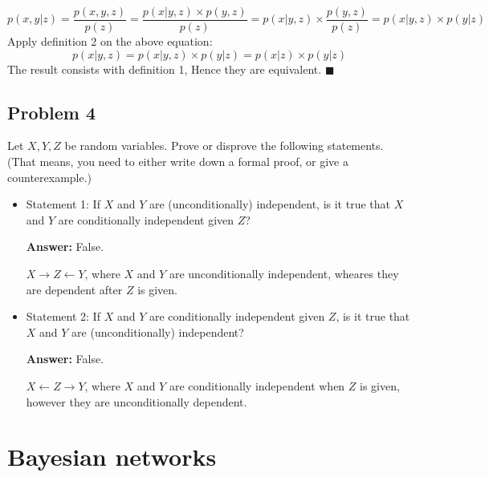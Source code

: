 \documentclass[]{article}
\begin{document}
$$p(x, y|z) = \frac{p(x, y, z)}{p(z)} = \frac{p(x|y, z)\times p(y, z)}{p(z)} = p(x|y, z)\times\frac{p(y, z)}{p(z)} = p(x|y, z)\times p(y|z)$$
Apply definition 2 on the above equation:
$$p(x|y, z) = p(x|y, z)\times p(y|z) = p(x|z)\times p(y|z)$$
The result consists with definition 1, Hence they are equivalent. \hfill $\blacksquare$


\subsection*{Problem 4}
 Let $X, Y, Z$ be random variables. Prove or disprove the following statements. (That means, you need to either write down a formal proof, or give a counterexample.)
 \begin{itemize}
 \item Statement 1: If $X$ and $Y$ are (unconditionally) independent, is it true that $X$ and $Y$ are conditionally independent given $Z$?
\par \textbf{Answer: }False.
\par $X\rightarrow Z\leftarrow Y$, where $X$ and $Y$ are unconditionally independent, wheares they are dependent after $Z$ is given.
 \item Statement 2: If $X$ and $Y$ are conditionally independent given $Z$, is it true that $X$ and $Y$ are (unconditionally) independent?
 \par \textbf{Answer: }False.
 \par $X\leftarrow Z\rightarrow Y$, where $X$ and $Y$ are conditionally independent when $Z$ is given, however they are unconditionally dependent.
 \end{itemize}
 
 
 \section*{Bayesian networks}
\end{document}
